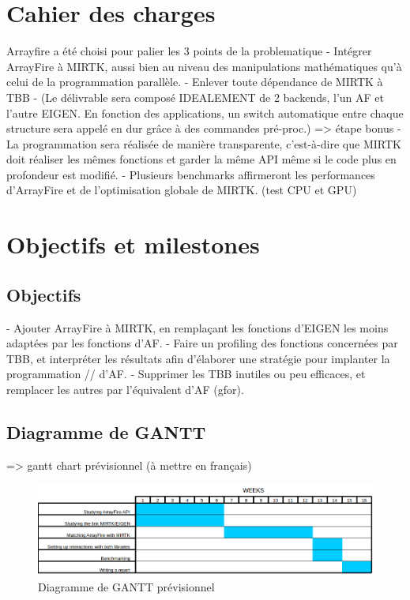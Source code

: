 \documentclass[10pt]{report}
\begin{document}
	\section{Cahier des charges}
	Arrayfire a été choisi pour palier les 3 points de la problematique \newline
	- Intégrer ArrayFire à MIRTK, aussi bien au niveau des manipulations mathématiques qu'à celui de la programmation parallèle.
	\newline- Enlever toute dépendance de MIRTK à TBB
	\newline- (Le délivrable sera composé IDEALEMENT de 2 backends, l'un AF et l'autre EIGEN. En fonction des applications, un switch automatique entre chaque structure sera appelé en dur grâce à des commandes pré-proc.) => étape bonus
	\newline- La programmation sera réalisée de manière transparente, c'est-à-dire que MIRTK doit réaliser les mêmes fonctions et garder la même API même si le code plus en profondeur est modifié.
	\newline- Plusieurs benchmarks affirmeront les performances d'ArrayFire et de l'optimisation globale de MIRTK. (test CPU et GPU)
	
	\section{Objectifs et milestones}
	
	\subsection{Objectifs} 
	- Ajouter ArrayFire à MIRTK, en remplaçant les fonctions d'EIGEN les moins adaptées par les fonctions d'AF. \newline
	- Faire un profiling des fonctions concernées par TBB, et interpréter les résultats afin d'élaborer une stratégie pour implanter la programmation // d'AF.\newline
	- Supprimer les TBB inutiles ou peu efficaces, et remplacer les autres par l'équivalent d'AF (gfor).\newline
	
	\vspace{5cm}
	\subsection{Diagramme de GANTT}
	 => gantt chart prévisionnel (à mettre en français)
	\begin{figure}[h!]
		\begin{center}
			\includegraphics[width=18cm]{Reports/figures/estimated_gantt.png}
		\end{center}	
		\caption{Diagramme de GANTT prévisionnel}
		\label{Diagramme de GANTT prévisionnel}
	\end{figure}
\end{document}
